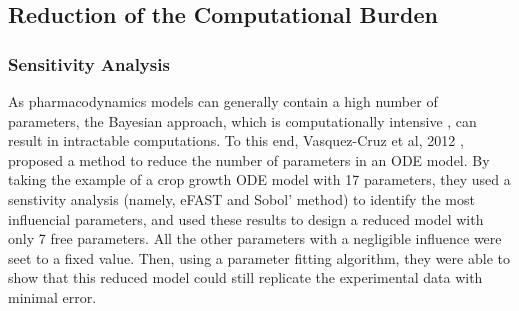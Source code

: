 \documentclass[11pt]{article}
\begin{document}
\subsection{Reduction of the Computational Burden}
\subsubsection{Sensitivity Analysis}
As pharmacodynamics models can generally contain a high number of parameters, the Bayesian approach, which is computationally intensive \cite{revParamEst}, can result in intractable computations. To this end, Vasquez-Cruz et al, 2012 \cite{tomgro}, proposed a method to reduce the number of parameters in an ODE model. By taking the example of a crop growth ODE model with 17 parameters, they used a senstivity analysis (namely, eFAST and Sobol' method) to identify the most influencial parameters, and used these results to design a reduced model with only 7 free parameters. All the other parameters with a negligible influence were seet to a fixed value. Then, using a parameter fitting algorithm, they were able to show that this reduced model could still replicate the experimental data with minimal error.

\end{document}
